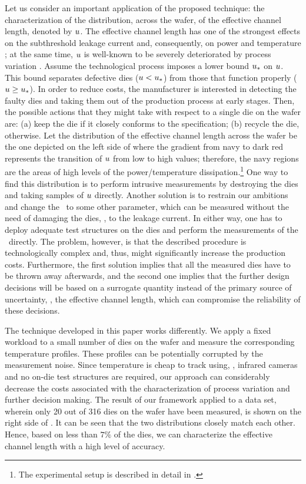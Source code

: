 
Let us consider an important application of the proposed technique: the characterization of the distribution, across the wafer, of the effective channel length, denoted by $u$. The effective channel length has one of the strongest effects on the subthreshold leakage current and, consequently, on power and temperature \cite{juan2011, juan2012}; at the same time, $u$ is well-known to be severely deteriorated by process variation \cite{chandrakasan2001, srivastava2010}.
Assume the technological process imposes a lower bound $u_*$ on $u$. This bound separates defective dies ($u < u_*$) from those that function properly ($u \geq u_*$).
In order to reduce costs, the manufacturer is interested in detecting the faulty dies and taking them out of the production process at early stages. Then, the possible actions that they might take with respect to a single die on the wafer are: (a) keep the die if it closely conforms to the specification; (b) recycle the die, otherwise.
Let the distribution of the effective channel length across the wafer be the one depicted on the left side of  where the gradient from navy to dark red represents the transition of $u$ from low to high values; therefore, the navy regions are the areas of high levels of the power/temperature dissipation.\footnote{The experimental setup is described in detail in .}
One way to find this distribution is to perform intrusive measurements by destroying the dies and taking samples of $u$ directly. Another solution is to restrain our ambitions and change the \qoi\ to some other parameter, which can be measured without the need of damaging the dies, \eg, to the leakage current. In either way, one has to deploy adequate test structures on the dies and perform the measurements of the \qoi\ directly. The problem, however, is that the described procedure is technologically complex and, thus, might significantly increase the production costs. Furthermore, the first solution implies that all the measured dies have to be thrown away afterwards, and the second one implies that the further design decisions will be based on a surrogate quantity instead of the primary source of uncertainty, \ie, the effective channel length, which can compromise the reliability of these decisions.

The technique developed in this paper works differently. We apply a fixed workload to a small number of dies on the wafer and measure the corresponding temperature profiles. These profiles can be potentially corrupted by the measurement noise. Since temperature is cheap to track using, \eg, infrared cameras and no on-die test structures are required, our approach can considerably decrease the costs associated with the characterization of process variation and further decision making.
The result of our framework applied to a data set, wherein only 20 out of 316 dies on the wafer have been measured, is shown on the right side of . It can be seen that the two distributions closely match each other. Hence, based on less than $7\%$ of the dies, we can characterize the effective channel length with a high level of accuracy.

